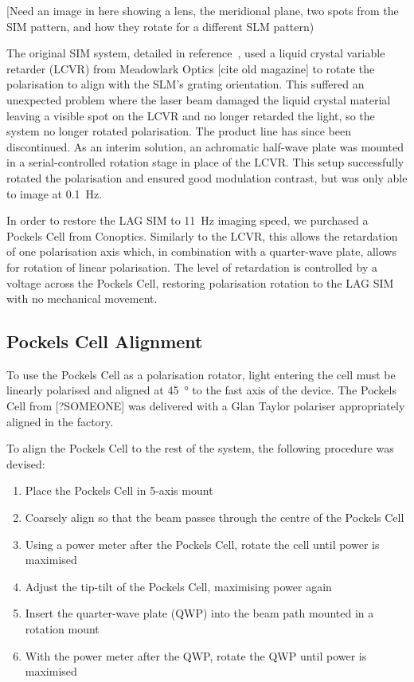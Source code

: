 [Need an image in here showing a lens, the meridional plane, two spots from the SIM pattern, and how they rotate for a different SLM pattern)

The original SIM system, detailed in reference~\cite{young2016guide}, used a liquid crystal variable retarder (LCVR) from Meadowlark Optics [cite old magazine] to rotate the polarisation to align with the SLM's grating orientation. 
This suffered an unexpected problem where the laser beam damaged the liquid crystal material leaving a visible spot on the LCVR and no longer retarded the light, so the system no longer rotated polarisation. 
The product line has since been discontinued.
As an interim solution, an achromatic half-wave plate was mounted in a serial-controlled rotation stage in place of the LCVR. 
This setup successfully rotated the polarisation and ensured good modulation contrast, but was only able to image at \SI{0.1}{\hertz}. 

In order to restore the LAG SIM to \SI{11}{\hertz} imaging speed, we purchased a Pockels Cell from Conoptics. 
Similarly to the LCVR, this allows the retardation of one polarisation axis which, in combination with a quarter-wave plate, allows for rotation of linear polarisation.
The level of retardation is controlled by a voltage across the Pockels Cell, restoring polarisation rotation to the LAG SIM with no mechanical movement. 

\subsection{Pockels Cell Alignment}
To use the Pockels Cell as a polarisation rotator, light entering the cell must be linearly polarised and aligned at \SI{45}{\degree} to the fast axis of the device. 
The Pockels Cell from [?SOMEONE] was delivered with a Glan Taylor polariser appropriately aligned in the factory. 

To align the Pockels Cell to the rest of the system, the following procedure was devised: %
\begin{enumerate}
	\item Place the Pockels Cell in 5-axis mount
	\item Coarsely align so that the beam passes through the centre of the Pockels Cell
	\item Using a power meter after the Pockels Cell, rotate the cell until power is maximised
	\item Adjust the tip-tilt of the Pockels Cell, maximising power again
	\item Insert the quarter-wave plate (QWP) into the beam path mounted in a rotation mount 
	\item With the power meter after the QWP, rotate the QWP until power is maximised
\end{enumerate}

